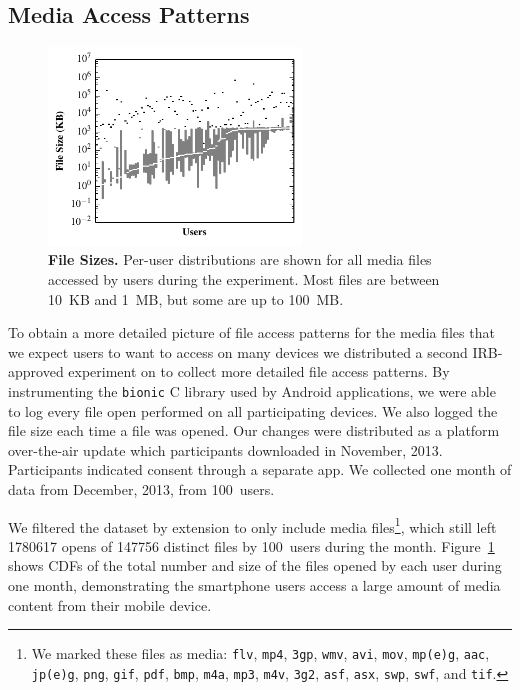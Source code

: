 \subsection{Media Access Patterns}

\begin{figure}

\vspace*{-0.4in}

\includegraphics[width=0.6\textwidth]{./figures/pocketlocker/FileSizeDistributionGraph.pdf}

\vspace*{-0.1in}

\caption{\small \textbf{File Sizes.} Per-user distributions are shown for all
media files accessed by users during the experiment. Most files
are between 10~KB and 1~MB, but some are up to 100~MB.}

\label{fig-motivation-totals}

\vspace*{-0.3in}

\end{figure}

To obtain a more detailed picture of file access patterns for the media files
that we expect users to want to access on many devices we distributed a
second IRB-approved experiment on \PhoneLab{} to collect more detailed file
access patterns. By instrumenting the \texttt{bionic} C library used by
Android applications, we were able to log every file open performed on all
participating devices. We also logged the file size each time a file was
opened. Our changes were distributed as a platform over-the-air update which
\PhoneLab{} participants downloaded in November, 2013. Participants indicated
consent through a separate app. We collected one month of data from December,
2013, from 100~users.

We filtered the dataset by extension to only include media files\footnote{We
marked these files as media: \texttt{flv}, \texttt{mp4},
\texttt{3gp}, \texttt{wmv}, \texttt{avi}, \texttt{mov}, \texttt{mp(e)g},
\texttt{aac}, \texttt{jp(e)g}, \texttt{png},
\texttt{gif}, \texttt{pdf}, \texttt{bmp}, \texttt{m4a}, \texttt{mp3},
\texttt{m4v}, \texttt{3g2}, \texttt{asf}, \texttt{asx}, \texttt{swp},
\texttt{swf}, and \texttt{tif}.}, which still left \num{1780617} opens of
\num{147756} distinct files by 100~users during the month.
Figure~\ref{fig-motivation-totals} shows CDFs of the total number and size of
the files opened by each \PhoneLab{} user during one month, demonstrating the
smartphone users access a large amount of media content from their mobile
device.

